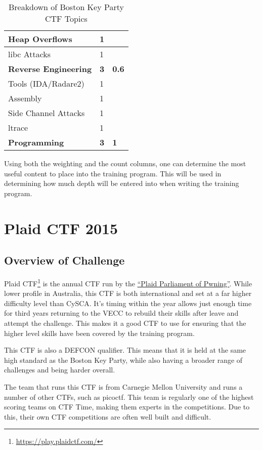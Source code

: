 \documentclass[twoside,a4paper,11pt]{report}
\begin{document}
\begin{table}[H]
\begin{tabular}{| l | l | l |}
				\quad Heap Overflows & 1 & \\ \hline 
				\quad libc Attacks & 1 & \\ \hline 
				\textbf{Reverse Engineering} & \textbf{3} & \textbf{0.6} \\ \hline
				\quad Tools (IDA/Radare2) & 1 & \\ \hline 
				\quad Assembly & 1 & \\ \hline 
				\quad Side Channel Attacks & 1 & \\ \hline 
				\quad ltrace & 1 & \\ \hline 
				\textbf{Programming} & \textbf{3} & \textbf{1}\\ \hline
			\end{tabular}
			\caption{Breakdown of Boston Key Party CTF Topics}
			\label{tab:BCTFBreakdown}
		\end{table}
		Using both the weighting and the count columns, one can determine the most useful content to place into the training program. 
		This will be used in determining how much depth will be entered into when writing the training program. 	
\chapter{Plaid CTF 2015}
	\section{Overview of Challenge}
		Plaid CTF\footnote{\url{https://play.plaidctf.com/}} is the annual CTF run by the \href{http://pwning.net/}{``Plaid Parliament of Pwning''}.
		While lower profile in Australia, this CTF is both international and set at a far higher difficulty level than CySCA. 
		It's timing within the year allows just enough time for third years returning to the VECC to rebuild their skills after leave and attempt the challenge. 
		This makes it a good CTF to use for ensuring that the higher level skills have been covered by the training program. 

		This CTF is also a DEFCON qualifier. 
		This means that it is held at the same high standard as the Boston Key Party, while also having a broader range of challenges and being harder overall. 

		The team that runs this CTF is from Carnegie Mellon University and runs a number of other CTFs, such as picoctf. 
		This team is regularly one of the highest scoring teams on CTF Time, making them experts in the competitions. 
		Due to this, their own CTF competitions are often well built and difficult. 
	
\end{document}
